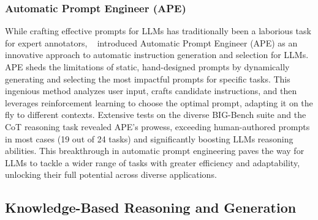 \documentclass{article}
\begin{document}
\subsubsection{Automatic Prompt Engineer (APE)}
\label{ape}
While crafting effective prompts for LLMs has traditionally been a laborious task for expert annotators, ~\cite{zhou2022large} introduced Automatic Prompt Engineer (APE) as an innovative approach to automatic instruction generation and selection for LLMs. APE sheds the limitations of static, hand-designed prompts by dynamically generating and selecting the most impactful prompts for specific tasks. This ingenious method analyzes user input, crafts candidate instructions, and then leverages reinforcement learning to choose the optimal prompt, adapting it on the fly to different contexts. Extensive tests on the diverse BIG-Bench suite and the CoT reasoning task revealed APE's prowess, exceeding human-authored prompts in most cases (19 out of 24 tasks) and significantly boosting LLMs reasoning abilities. This breakthrough in automatic prompt engineering paves the way for LLMs to tackle a wider range of tasks with greater efficiency and adaptability, unlocking their full potential across diverse applications.

\subsection{Knowledge-Based Reasoning and Generation}\label{kbrg}
\end{document}
